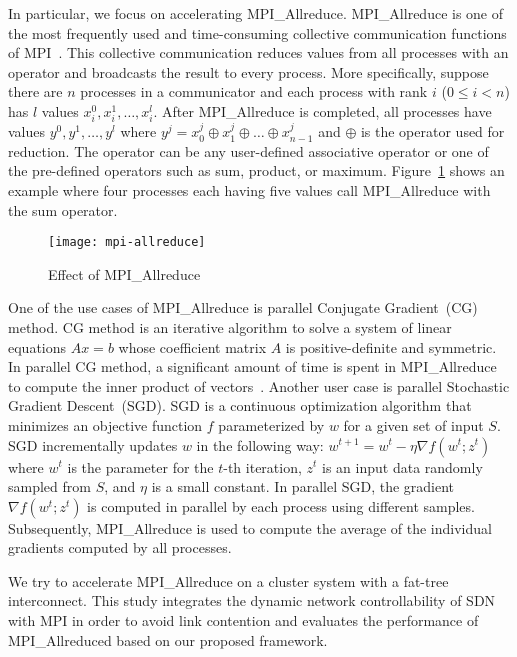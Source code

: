 In particular, we focus on accelerating MPI\_Allreduce.
MPI\_Allreduce is one of the most frequently used and time-consuming
collective communication functions of MPI\@~\cite{Chunduri2018}.
This collective communication reduces values from all
processes with an operator and broadcasts the result to every process.
More specifically, suppose there are $n$ processes in a communicator and
each process with rank $i$ ($0 \leq i < n$) has $l$ values $x_i^0, x_i^1,
\dots, x_i^l$. After MPI\_Allreduce is completed, all processes have values
$y^0, y^1, \dots, y^l$ where $y^j = x_0^j \oplus x_1^j \oplus \dots \oplus
x_{n-1}^j$ and $\oplus$ is the operator used for reduction. The operator can
be any user-defined associative operator or one of the pre-defined operators
such as sum, product, or maximum. Figure~\ref{fig:mpi-allreduce} shows an
example where four processes each having five values call MPI\_Allreduce with
the sum operator.

\begin{figure}
    \centering
    \texttt{[image: mpi-allreduce]}
    \caption{Effect of MPI\_Allreduce}%
    \label{fig:mpi-allreduce}
\end{figure}

One of the use cases of MPI\_Allreduce is parallel Conjugate Gradient~(CG)
method. CG method is an iterative algorithm to solve a system of linear
equations $Ax = b$ whose coefficient matrix $A$ is positive-definite and
symmetric. In parallel CG method, a significant amount of time is spent in
MPI\_Allreduce to compute the inner product of
vectors~\autocite{Kandalla2012}. Another user case is parallel Stochastic
Gradient Descent~(SGD). SGD is a continuous optimization algorithm that
minimizes an objective function $f$ parameterized by $w$ for a given set of
input $S$. SGD incrementally updates $w$ in the following way: $w^{t+1}=w^t-
\eta \nabla f(w^t; z^t)$ where $w^t$ is the parameter for the $t$-th
iteration, $z^t$ is an input data randomly sampled from $S$, and $\eta$ is a
small constant. In parallel SGD, the gradient $\nabla f(w^t; z^t)$ is computed
in parallel by each process using different samples. Subsequently,
MPI\_Allreduce is used to compute the average of the individual gradients
computed by all processes.

We try to accelerate MPI\_Allreduce on a cluster system with a fat-tree
interconnect. This study integrates the dynamic network controllability of SDN
with MPI in order to avoid link contention and evaluates the performance of
MPI\_Allreduced based on our proposed framework.

